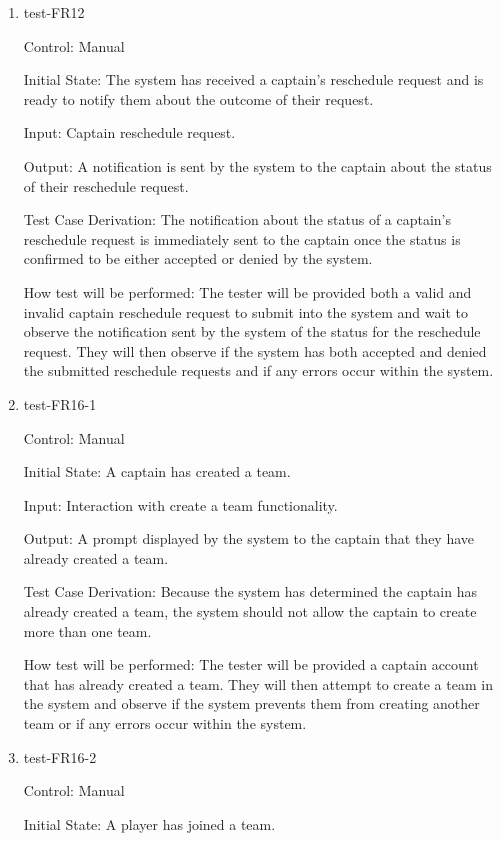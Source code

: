 \documentclass[12pt, titlepage]{article}
\begin{document}
\begin{enumerate}
\item{test-FR12\\}

Control: Manual
					
Initial State: The system has received a captain's reschedule request and is ready to
notify them about the outcome of their request.
					
Input: Captain reschedule request.
					
Output: A notification is sent by the system to the captain about the status of their
reschedule request.

Test Case Derivation: The notification about the status of a captain's reschedule
request is immediately sent to the captain once the status is confirmed to be either
accepted or denied by the system.
					
How test will be performed: The tester will be provided both a valid and invalid captain
reschedule request to submit into the system and wait to observe the notification sent
by the system of the status for the reschedule request. They will then observe if the
system has both accepted and denied the submitted reschedule requests and if any errors
occur within the system. 

\item{test-FR16-1\\}

Control: Manual
					
Initial State: A captain has created a team.
					
Input: Interaction with create a team functionality.
					
Output: A prompt displayed by the system to the captain that they have already created
a team.

Test Case Derivation: Because the system has determined the captain has already created a
team, the system should not allow the captain to create more than one team.
					
How test will be performed: The tester will be provided a captain account that has already
created a team. They will then attempt to create a team in the system and observe if the
system prevents them from creating another team or if any errors occur within the system.

\item{test-FR16-2\\}

Control: Manual
					
Initial State: A player has joined a team.
					

\end{enumerate}
\end{document}

